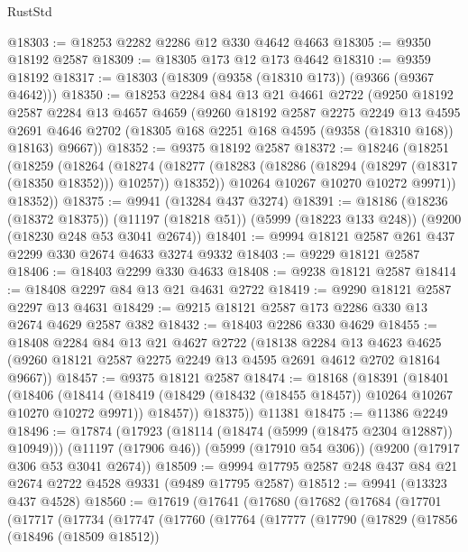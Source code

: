 \begin{lexlean}{RustStd}
\begin{coremodule}
@18303 := @18253 @2282 @2286 @12 @330 @4642 @4663
@18305 := @9350 @18192 @2587
@18309 := @18305 @173 @12 @173 @4642
@18310 := @9359 @18192
@18317 := @18303 (@18309 (@9358 (@18310 @173)) (@9366 (@9367 @4642)))
@18350 := @18253
    @2284
    @84
    @13
    @21
    @4661
    @2722
    (@9250
      @18192
      @2587
      @2284
      @13
      @4657
      @4659
      (@9260
        @18192
        @2587
        @2275
        @2249
        @13
        @4595
        @2691
        @4646
        @2702
        (@18305 @168 @2251 @168 @4595 (@9358 (@18310 @168)) @18163)
        @9667))
@18352 := @9375 @18192 @2587
@18372 := @18246
    (@18251
      (@18259
        (@18264
          (@18274
            (@18277 (@18283 (@18286 (@18294 (@18297 (@18317 (@18350 @18352))) @10257)) @18352))
            @10264
            @10267
            @10270
            @10272
            @9971))
        @18352))
@18375 := @9941 (@13284 @437 @3274)
@18391 := @18186
    (@18236 (@18372 @18375))
    (@11197 (@18218 @51))
    (@5999 (@18223 @133 @248))
    (@9200 (@18230 @248 @53 @3041 @2674))
@18401 := @9994 @18121 @2587 @261 @437 @2299 @330 @2674 @4633 @3274 @9332
@18403 := @9229 @18121 @2587
@18406 := @18403 @2299 @330 @4633
@18408 := @9238 @18121 @2587
@18414 := @18408 @2297 @84 @13 @21 @4631 @2722
@18419 := @9290 @18121 @2587 @2297 @13 @4631
@18429 := @9215 @18121 @2587 @173 @2286 @330 @13 @2674 @4629 @2587 @382
@18432 := @18403 @2286 @330 @4629
@18455 := @18408
    @2284
    @84
    @13
    @21
    @4627
    @2722
    (@18138
      @2284
      @13
      @4623
      @4625
      (@9260 @18121 @2587 @2275 @2249 @13 @4595 @2691 @4612 @2702 @18164 @9667))
@18457 := @9375 @18121 @2587
@18474 := @18168
    (@18391
      (@18401
        (@18406
          (@18414
            (@18419 (@18429 (@18432 (@18455 @18457)) @10264 @10267 @10270 @10272 @9971))
            @18457))
        @18375))
    @11381
@18475 := @11386 @2249
@18496 := @17874
    (@17923 (@18114 (@18474 (@5999 (@18475 @2304 @12887)) @10949)))
    (@11197 (@17906 @46))
    (@5999 (@17910 @54 @306))
    (@9200 (@17917 @306 @53 @3041 @2674))
@18509 := @9994 @17795 @2587 @248 @437 @84 @21 @2674 @2722 @4528 @9331 (@9489 @17795 @2587)
@18512 := @9941 (@13323 @437 @4528)
@18560 := @17619
    (@17641
      (@17680
        (@17682
          (@17684
            (@17701
              (@17717
                (@17734
                  (@17747
                    (@17760
                      (@17764
                        (@17777
                          (@17790
                            (@17829
                              (@17856
                                (@18496 (@18509 @18512))

\end{coremodule}
\end{lexlean}
